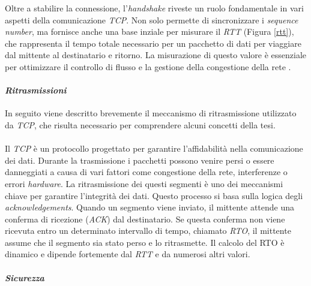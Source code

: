 \noindent Oltre a stabilire la connessione, l'\emph{handshake} riveste un ruolo fondamentale in vari aspetti della comunicazione \emph{TCP}.
Non solo permette di sincronizzare i \emph{sequence number}, ma fornisce anche una base inziale per misurare il \emph{\gls*{RTT}{}} (Figura \ref{rtt}), che rappresenta il tempo totale necessario per un pacchetto di dati per viaggiare dal mittente al destinatario e ritorno. La misurazione di questo valore è essenziale per ottimizzare il controllo di flusso e la gestione della congestione della rete \cite{site:tcp}.

\paragraph{\textit{Ritrasmissioni}}

\noindent In seguito viene descritto brevemente il meccanismo di ritrasmissione utilizzato da \emph{TCP}, che risulta necessario per comprendere alcuni concetti della tesi.
\\\\
\noindent Il \emph{TCP} è un protocollo progettato per garantire l'affidabilità nella comunicazione dei dati. Durante la trasmissione i pacchetti possono venire persi o essere danneggiati a causa di vari fattori come congestione della rete, interferenze o errori \emph{hardware}.
La ritrasmissione dei questi segmenti è uno dei meccanismi chiave per garantire l'integrità dei dati. Questo processo si basa sulla logica degli \emph{acknowledgements}. Quando un segmento viene inviato, il mittente attende una conferma di ricezione (\emph{ACK}) dal destinatario. Se questa conferma non viene ricevuta entro un determinato intervallo di tempo, chiamato \emph{\gls*{RTO}{}}, il mittente assume che il segmento sia stato perso e lo ritrasmette.
Il calcolo del RTO è dinamico e dipende fortemente dal \emph{RTT} e da numerosi altri valori. 
\paragraph{\textit{Sicurezza}}

